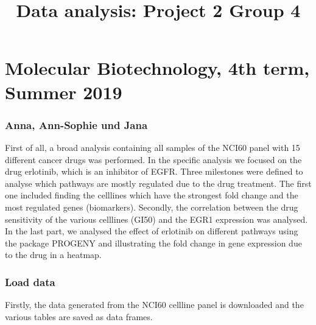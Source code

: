 \documentclass[]{article}
\title{Data analysis: Project 2 Group 4}
\author{}
\date{}
\begin{document}
\maketitle

\hypertarget{molecular-biotechnology-4th-term-summer-2019}{%
\section{Molecular Biotechnology, 4th term, Summer
2019}\label{molecular-biotechnology-4th-term-summer-2019}}

\hypertarget{anna-ann-sophie-und-jana}{%
\subsubsection{Anna, Ann-Sophie und
Jana}\label{anna-ann-sophie-und-jana}}

First of all, a broad analysis containing all samples of the NCI60 panel
with 15 different cancer drugs was performed. In the specific analysis
we focused on the drug erlotinib, which is an inhibitor of EGFR. Three
milestones were defined to analyse which pathways are mostly regulated
due to the drug treatment. The first one included finding the celllines
which have the strongest fold change and the most regulated genes
(biomarkers). Secondly, the correlation between the drug sensitivity of
the various celllines (GI50) and the EGR1 expression was analysed. In
the last part, we analysed the effect of erlotinib on different pathways
using the package PROGENY and illustrating the fold change in gene
expression due to the drug in a heatmap.

\hypertarget{load-data}{%
\subsubsection{Load data}\label{load-data}}

Firstly, the data generated from the NCI60 cellline panel is downloaded
and the various tables are saved as data frames.
\end{document}
